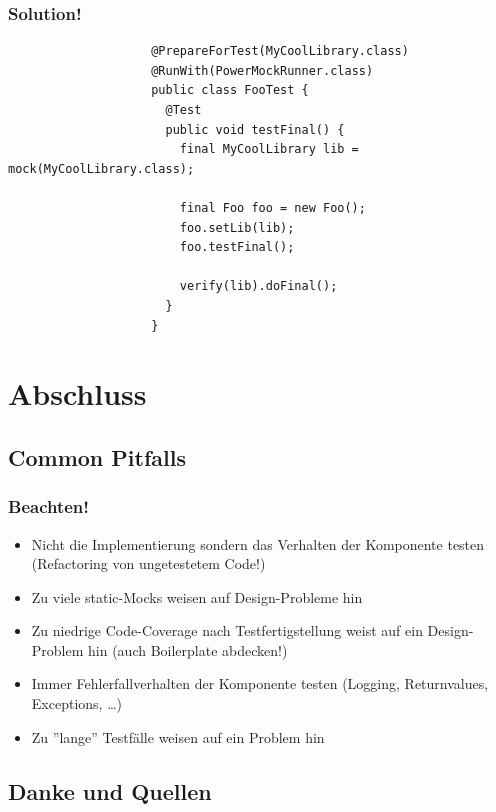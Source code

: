 \documentclass{beamer}
\begin{document}
			\begin{frame}[fragile]
				\frametitle{Solution!}

				\begin{lstlisting}
					@PrepareForTest(MyCoolLibrary.class)
					@RunWith(PowerMockRunner.class)
					public class FooTest {
					  @Test
					  public void testFinal() {
					    final MyCoolLibrary lib = mock(MyCoolLibrary.class);

					    final Foo foo = new Foo();
					    foo.setLib(lib);
					    foo.testFinal();

					    verify(lib).doFinal();
					  }
					}
				\end{lstlisting}
			\end{frame}


	\logo{}
	\section{Abschluss}

		\subsection{Common Pitfalls}

			\begin{frame}
				\frametitle{Beachten!}

				\begin{itemize}
					\item{Nicht die Implementierung sondern das Verhalten der Komponente testen (Refactoring von ungetestetem Code!)}
					\pause
					\item{Zu viele static-Mocks weisen auf Design-Probleme hin}
					\pause
					\item{Zu niedrige Code-Coverage nach Testfertigstellung weist auf ein Design-Problem hin (auch Boilerplate abdecken!)}
					\pause
					\item{Immer Fehlerfallverhalten der Komponente testen (Logging, Returnvalues, Exceptions, \ldots)}
					\pause
					\item{Zu ''lange'' Testfälle weisen auf ein Problem hin}
				\end{itemize}
			\end{frame}

		
		\subsection{Danke und Quellen}
\end{document}
